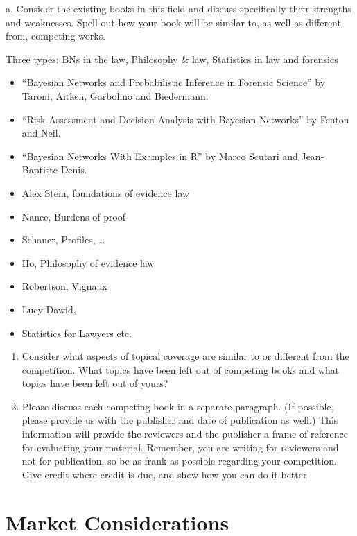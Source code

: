 \documentclass[10pt,dvipsnames,enabledeprecatedfontcommands]{scrartcl}
\begin{document}
\footnotesize a. Consider the existing books in this field and discuss
specifically their strengths and weaknesses. Spell out how your book
will be similar to, as well as different from, competing works.


\normalsize

Three types: BNs in the law, Philosophy \& law, Statistics in law and
forensics

\begin{itemize}
\item
  ``Bayesian Networks and Probabilistic Inference in Forensic Science''
  by Taroni, Aitken, Garbolino and Biedermann.
\item
  ``Risk Assessment and Decision Analysis with Bayesian Networks'' by
  Fenton and Neil.
\item
  ``Bayesian Networks With Examples in R'' by Marco Scutari and
  Jean-Baptiste Denis.
\item
  Alex Stein, foundations of evidence law
\item
  Nance, Burdens of proof
\item
  Schauer, Profiles, \dots
\item
  Ho, Philosophy of evidence law
\item
  Robertson, Vignaux
\item
  Lucy Dawid,
\item
  Statistics for Lawyers etc.
\end{itemize}

\begin{enumerate}
\def\labelenumi{\alph{enumi}.}
\setcounter{enumi}{1}
\item
  Consider what aspects of topical coverage are similar to or different
  from the competition. What topics have been left out of competing
  books and what topics have been left out of yours?
\item
  Please discuss each competing book in a separate paragraph. (If
  possible, please provide us with the publisher and date of publication
  as well.) This information will provide the reviewers and the
  publisher a frame of reference for evaluating your material. Remember,
  you are writing for reviewers and not for publication, so be as frank
  as possible regarding your competition. Give credit where credit is
  due, and show how you can do it better.
\end{enumerate}

\hypertarget{market-considerations}{%
\section{Market Considerations}\label{market-considerations}}
\end{document}
